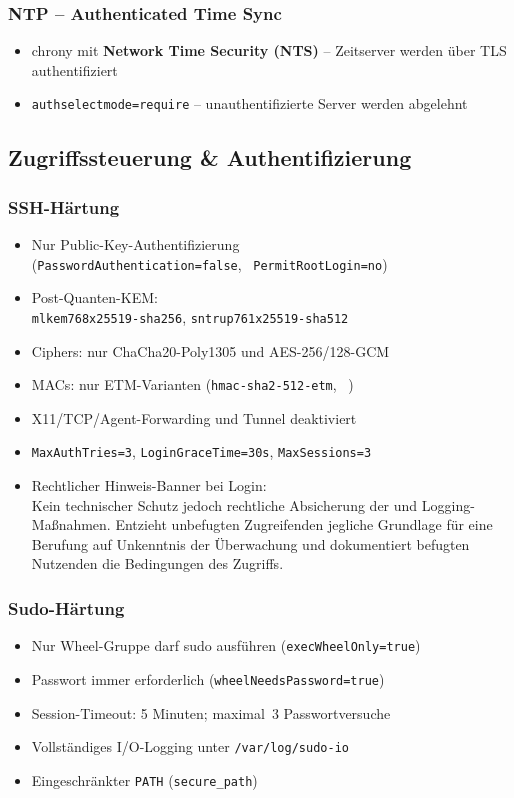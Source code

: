 \subsubsection*{\acs{NTP} -- Authenticated Time Sync}
\begin{itemize}
  \item chrony mit \textbf{Network Time Security (\acs{NTS})} -- Zeitserver werden über \acs{TLS} authentifiziert
  \item \texttt{authselectmode=require} -- unauthentifizierte Server werden abgelehnt
\end{itemize}


\subsection{Zugriffssteuerung \& Authentifizierung}
\subsubsection*{\acs{SSH}-Härtung}
\begin{itemize}
  \item Nur Public-Key-Authentifizierung \\(\texttt{PasswordAuthentication=false},~ \texttt{PermitRootLogin=no})
  \item Post-Quanten-\ac{KEM}:\\
    \texttt{mlkem768x25519-sha256}, \texttt{sntrup761x25519-sha512}
  \item Ciphers: nur ChaCha20-Poly1305 und \acs{AES}-256/128-\acs{GCM}
  \item \acs{MAC}s: nur \acs{ETM}-Varianten (\texttt{hmac-sha2-512-etm},~ \texttt{})
  \item X11/\acs{TCP}/Agent-Forwarding und Tunnel deaktiviert
  \item \texttt{MaxAuthTries=3}, \texttt{LoginGraceTime=30s}, \texttt{MaxSessions=3}
  \item Rechtlicher Hinweis-Banner bei Login: \\Kein technischer Schutz jedoch rechtliche Absicherung der  und Logging-Maßnahmen. Entzieht
  unbefugten Zugreifenden jegliche Grundlage für eine Berufung auf Unkenntnis der Überwachung und
  dokumentiert befugten Nutzenden die Bedingungen des Zugriffs.
\end{itemize}

\subsubsection*{Sudo-Härtung}
\begin{itemize}
  \item Nur Wheel-Gruppe darf sudo ausführen (\texttt{execWheelOnly=true})
  \item Passwort immer erforderlich (\texttt{wheelNeedsPassword=true})
  \item Session-Timeout: 5 Minuten; maximal\ 3 Passwortversuche
  \item Vollständiges I/O-Logging unter \texttt{/var/log/sudo-io}
  \item Eingeschränkter \texttt{PATH} (\texttt{secure\_path})
\end{itemize}

